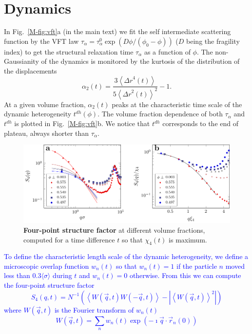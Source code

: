 \documentclass[prl,twocolumn,notitlepage]{revtex4-1}
\begin{document}
\section*{Dynamics}

In Fig.~\ref{M-fig:vft}a (in the main text) we fit the self intermediate scattering function by the VFT law $\tau_\alpha=\tau_\alpha^0 \exp(D\phi/(\phi_0-\phi))$ ($D$ being the fragility index) to get the structural relaxation time $\tau_\alpha$ as a function of $\phi$. The non-Gaussianity of the dynamics is monitored by the kurtosis of the distribution of the displacements 
\begin{equation}
	\alpha_2(t) = \frac{3 \left\langle {\Delta r}^4(t) \right\rangle}{5 {\left\langle {\Delta r}^2(t) \right\rangle}^2}-1. 
	\label{eq:ng}
\end{equation}
At a given volume fraction, $\alpha_2(t)$ peaks at the characteristic time scale of the dynamic heterogeneity $t^{dh}(\phi)$. The volume fraction dependence of both $\tau_\alpha$ and $t^{dh}$ is plotted in Fig.~\ref{M-fig:vft}b. We notice that $t^{dh}$ corresponds to the end of plateau, always shorter than $\tau_\alpha$.

\begin{figure}
\begin{center}
\includegraphics{generate_figures-figure8.pdf}
\end{center}
\caption{\textbf{Four-point structure factor} at different volume fractions, computed for a time difference $t$ so that $\chi_4(t)$ is maximum.}
	\label{fig:S4}
\end{figure}

\textcolor{blue}{To define the characteristic length scale of the dynamic heterogeneity, we define a microscopic overlap function $w_n(t)$ so that $w_n(t)=1$ if the particle $n$ moved less than $0.3\langle\sigma\rangle$ during $t$ and $w_n(t)=0$ otherwise. From this we can compute the four-point structure factor~\cite{Flenner2011}
\begin{equation}
	S_4(q,t) = N^{-1}(\left\langle W(\vec{q},t) W(-\vec{q},t) \right\rangle - | \left\langle W(\vec{q},t) \right\rangle^2 |)
	\label{eq:S4}
\end{equation}
where $W(\vec{q},t)$ is the Fourier transform of $w_n(t)$
\begin{equation}
	W(\vec{q},t) = \sum_n w_n(t)\exp(-\imath \vec{q}\cdot\vec{r}_n(0))
\end{equation}}
\end{document}
